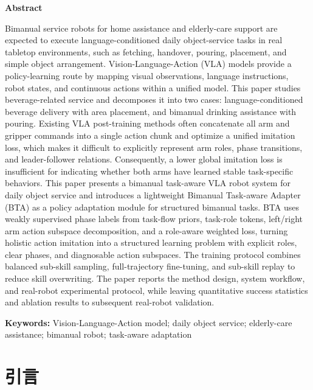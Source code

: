 \documentclass[UTF8,a4paper,zihao=5,scheme=chinese]{ctexart}
\numberwithin{figure}{section}
\numberwithin{table}{section}
\begin{document}
\vspace{1em}
\begin{center}
  \textbf{Abstract}
\end{center}
\noindent
Bimanual service robots for home assistance and elderly-care support are expected to execute language-conditioned daily object-service tasks in real tabletop environments, such as fetching, handover, pouring, placement, and simple object arrangement. Vision-Language-Action (VLA) models provide a policy-learning route by mapping visual observations, language instructions, robot states, and continuous actions within a unified model. This paper studies beverage-related service and decomposes it into two cases: language-conditioned beverage delivery with area placement, and bimanual drinking assistance with pouring. Existing VLA post-training methods often concatenate all arm and gripper commands into a single action chunk and optimize a unified imitation loss, which makes it difficult to explicitly represent arm roles, phase transitions, and leader-follower relations. Consequently, a lower global imitation loss is insufficient for indicating whether both arms have learned stable task-specific behaviors. This paper presents a bimanual task-aware VLA robot system for daily object service and introduces a lightweight Bimanual Task-aware Adapter (BTA) as a policy adaptation module for structured bimanual tasks. BTA uses weakly supervised phase labels from task-flow priors, task-role tokens, left/right arm action subspace decomposition, and a role-aware weighted loss, turning holistic action imitation into a structured learning problem with explicit roles, clear phases, and diagnosable action subspaces. The training protocol combines balanced sub-skill sampling, full-trajectory fine-tuning, and sub-skill replay to reduce skill overwriting. The paper reports the method design, system workflow, and real-robot experimental protocol, while leaving quantitative success statistics and ablation results to subsequent real-robot validation.

\noindent\textbf{Keywords:} Vision-Language-Action model; daily object service; elderly-care assistance; bimanual robot; task-aware adaptation

\clearpage
\tableofcontents

\clearpage
\section{引言}
\end{document}
